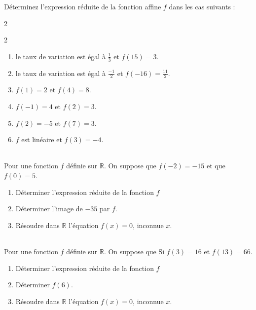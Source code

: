 \documentclass[main.tex]{subfiles}
\begin{document}
\begin{exercise} 
  	Déterminez l'expression réduite de la fonction affine $f$ dans les cas suivants :
	\vspace{-0.5em}
	 	\begin{multicols}{2}
		\begin{spacing}{2} 
		\begin{enumerate}[ label=\arabic*), leftmargin=*]
			\item le taux de variation est égal à $\tfrac{1}{3}$ et $f(15)=3$. 
			\item le taux de variation  est égal à  $\tfrac{-1}{2}$ et $f(-16)=\tfrac{11}{2}$. 
			\item $f (1)=2$ et $f (4)=8$. 
			\item $f (-1)=4$ et $f (2)=3$.
			\item $f (2)=-5$ et $f (7)=3$.
			\item $f$ est linéaire et $f(3) =-4$.
		\end{enumerate}
	\end{spacing}
		 	\end{multicols}
\end{exercise}\vspace{-1em} 
\begin{exercise}\hfill \\
Pour une fonction $f$ définie sur $\mathbb{R}$. On suppose que $f(-2)=-15$ et que $f(0)=5$.
\begin{enumerate}[leftmargin=*,label={\arabic*)}]
	\item Déterminer l'expression réduite de la fonction $f$
	\item Déterminer l'image de $-35$ par $f$.
	\item Résoudre dans $\mathbb{R}$ l'équation $f(x)=0$, inconnue $x$.
\end{enumerate}
\end{exercise}
\begin{exercise}\hfill \\
Pour une fonction $f$ définie sur $\mathbb{R}$. On suppose que Si $f(3)=16$ et $f(13)=66$. 
\begin{enumerate}[leftmargin=*,label={\arabic*)}]
	\item Déterminer l'expression réduite de la fonction $f$
	\item Déterminer $f(6)$.
	\item Résoudre dans $\mathbb{R}$ l'équation $f(x)=0$, inconnue $x$.
\end{enumerate}
\end{exercise}
\end{document}
